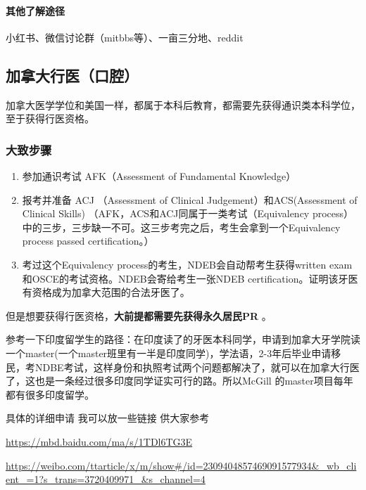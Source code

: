 \documentclass[zihao=-4,fontset=none]{Beautybook-CN}
\begin{document}
\paragraph{其他了解途径}

小红书、微信讨论群（mitbbs等）、一亩三分地、reddit

\subsection{加拿大行医（口腔）}

加拿大医学学位和美国一样，都属于本科后教育，都需要先获得通识类本科学位，至于获得行医资格。
\subsubsection{大致步骤}
\begin{enumerate}
\item 参加通识考试 AFK（Assessment of Fundamental Knowledge）
\item 报考并准备 ACJ （Assessment of Clinical Judgement）和ACS(Assessment of Clinical Skills) （AFK，ACS和ACJ同属于一类考试（Equivalency process）中的三步，三步缺一不可。这三步考完之后，考生会拿到一个Equivalency process passed certification。）
\item  考过这个Equivalency process的考生，NDEB会自动帮考生获得written exam和OSCE的考试资格。NDEB会寄给考生一张NDEB certification。证明该牙医有资格成为加拿大范围的合法牙医了。
\end{enumerate}
\begin{theorem}
    但是想要获得行医资格，\textbf{大前提都需要先获得永久居民PR} 。
\end{theorem}


参考一下印度留学生的路径：在印度读了的牙医本科同学，申请到加拿大牙学院读一个master(一个master班里有一半是印度同学)，学法语，2-3年后毕业申请移民，考NDBE考试，这样身份和执照考试两个问题都解决了，就可以在加拿大行医了，这也是一条经过很多印度同学证实可行的路。所以McGill 的master项目每年都有很多印度留学。

具体的详细申请 我可以放一些链接 供大家参考

\href{https://mbd.baidu.com/ma/s/1TDlTG3E}{https://mbd.baidu.com/ma/s/1TDl6TG3E}

\url{https://weibo.com/ttarticle/x/m/show\#/id=2309404857469091577934&_wb_client_=1?s_trans=3720409971_&s_channel=4}
\end{document}
